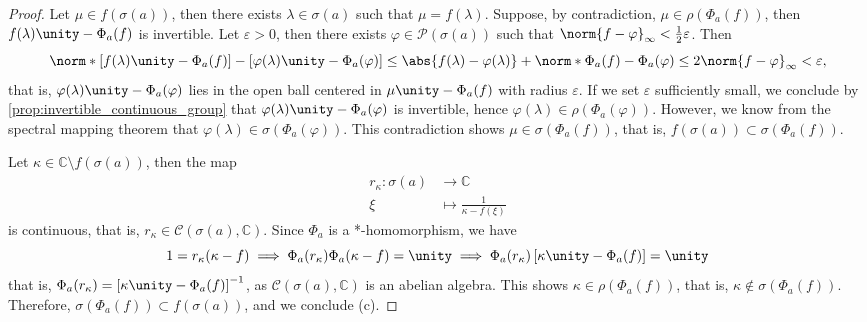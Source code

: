 \begin{proof}
    Let \(\mu \in f(\sigma(a))\), then there exists \(\lambda \in \sigma(a)\) such that \(\mu = f(\lambda)\). Suppose, by  contradiction, \(\mu \in \rho(\Phi_a(f))\), then \(f(\lambda)\unity - \Phi_a(f)\) is invertible. Let \(\varepsilon > 0\), then there exists \(\varphi \in \mathcal{P}(\sigma(a))\) such that \(\norm{f - \varphi}_{\infty} < \frac12 \varepsilon\). Then
    \begin{equation*}
        \norm*{[f(\lambda)\unity - \Phi_a(f)] - [\varphi(\lambda)\unity - \Phi_a(\varphi)]} \leq \abs{f(\lambda) - \varphi(\lambda)} + \norm*{\Phi_a(f) - \Phi_a(\varphi)} \leq 2 \norm{f - \varphi}_\infty < \varepsilon,
    \end{equation*}
    that is, \(\varphi(\lambda)\unity - \Phi_a(\varphi)\) lies in the open ball centered in \(\mu \unity - \Phi_a(f)\) with radius \(\varepsilon\). If we set \(\varepsilon\) sufficiently small, we conclude by \cref{prop:invertible_continuous_group} that \(\varphi(\lambda) \unity - \Phi_a(\varphi)\) is invertible, hence \(\varphi(\lambda) \in \rho(\Phi_a(\varphi))\). However, we know from the spectral mapping theorem that \(\varphi(\lambda) \in \sigma(\Phi_a(\varphi)).\) This contradiction shows \(\mu \in \sigma(\Phi_a(f))\), that is, \(f(\sigma(a)) \subset \sigma(\Phi_a(f))\).

    Let \(\kappa \in \mathbb{C} \setminus f(\sigma(a))\), then the map
    \begin{align*}
        r_{\kappa} : \sigma(a) &\to \mathbb{C}\\
                           \xi &\mapsto \frac{1}{\kappa - f(\xi)}
    \end{align*}
    is continuous, that is, \(r_{\kappa} \in \mathcal{C}\left(\sigma(a), \mathbb{C}\right)\). Since \(\Phi_a\) is a *-homomorphism, we have
    \begin{equation*}
        1 = r_{\kappa} (\kappa - f) \implies \Phi_a(r_{\kappa}) \Phi_a(\kappa - f) = \unity \implies \Phi_a(r_{\kappa}) \left[\kappa \unity - \Phi_a(f)\right] = \unity
    \end{equation*}
    that is, \(\Phi_a(r_{\kappa}) = \left[\kappa\unity - \Phi_a(f)\right]^{-1}\), as \(\mathcal{C}\left(\sigma(a), \mathbb{C}\right)\) is an abelian algebra. This shows \(\kappa \in \rho(\Phi_a(f))\), that is, \(\kappa \notin \sigma(\Phi_a(f))\). Therefore, \(\sigma(\Phi_a(f)) \subset f(\sigma(a))\), and we conclude (c).
\end{proof}

